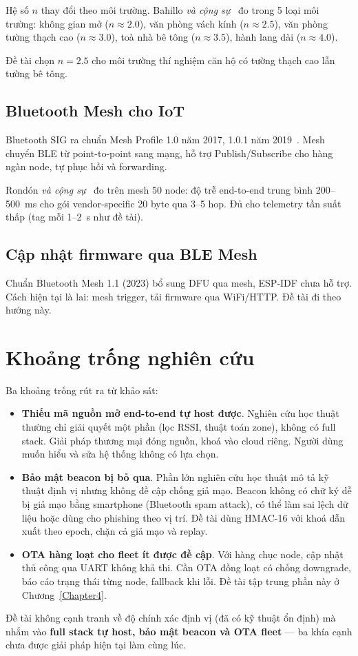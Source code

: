 Hệ số $n$ thay đổi theo môi trường. Bahillo \textit{và cộng sự}~\cite{bahillo-pathloss} đo trong 5 loại môi trường: không gian mở ($n \approx 2.0$), văn phòng vách kính ($n \approx 2.5$), văn phòng tường thạch cao ($n \approx 3.0$), toà nhà bê tông ($n \approx 3.5$), hành lang dài ($n \approx 4.0$).

Đề tài chọn $n = 2.5$ cho môi trường thí nghiệm căn hộ có tường thạch cao lẫn tường bê tông.

\subsection{Bluetooth Mesh cho IoT}

Bluetooth SIG ra chuẩn Mesh Profile 1.0 năm 2017, 1.0.1 năm 2019~\cite{ble-mesh-spec}. Mesh chuyển BLE từ point-to-point sang mạng, hỗ trợ Publish/Subscribe cho hàng ngàn node, tự phục hồi và forwarding.

Rondón \textit{và cộng sự}~\cite{rondon-ble-mesh} đo trên mesh 50 node: độ trễ end-to-end trung bình 200--500~ms cho gói vendor-specific 20 byte qua 3--5 hop. Đủ cho telemetry tần suất thấp (tag mỗi 1--2~s như đề tài).

\subsection{Cập nhật firmware qua BLE Mesh}

Chuẩn Bluetooth Mesh 1.1 (2023) bổ sung DFU qua mesh, ESP-IDF chưa hỗ trợ. Cách hiện tại là lai: mesh trigger, tải firmware qua WiFi/HTTP. Đề tài đi theo hướng này.

\section{Khoảng trống nghiên cứu}

Ba khoảng trống rút ra từ khảo sát:

\begin{itemize}
    \item \textbf{Thiếu mã nguồn mở end-to-end tự host được}. Nghiên cứu học thuật thường chỉ giải quyết một phần (lọc RSSI, thuật toán zone), không có full stack. Giải pháp thương mại đóng nguồn, khoá vào cloud riêng. Người dùng muốn hiểu và sửa hệ thống không có lựa chọn.

    \item \textbf{Bảo mật beacon bị bỏ qua}. Phần lớn nghiên cứu học thuật mô tả kỹ thuật định vị nhưng không đề cập chống giả mạo. Beacon không có chữ ký dễ bị giả mạo bằng smartphone (Bluetooth spam attack), có thể làm sai lệch dữ liệu hoặc dùng cho phishing theo vị trí. Đề tài dùng HMAC-16 với khoá dẫn xuất theo epoch, chặn cả giả mạo và replay.

    \item \textbf{OTA hàng loạt cho fleet ít được đề cập}. Với hàng chục node, cập nhật thủ công qua UART không khả thi. Cần OTA đồng loạt có chống downgrade, báo cáo trạng thái từng node, fallback khi lỗi. Đề tài tập trung phần này ở Chương~\ref{Chapter4}.
\end{itemize}

Đề tài không cạnh tranh về độ chính xác định vị (đã có kỹ thuật ổn định) mà nhắm vào \textbf{full stack tự host, bảo mật beacon và OTA fleet} --- ba khía cạnh chưa được giải pháp hiện tại làm cùng lúc.
